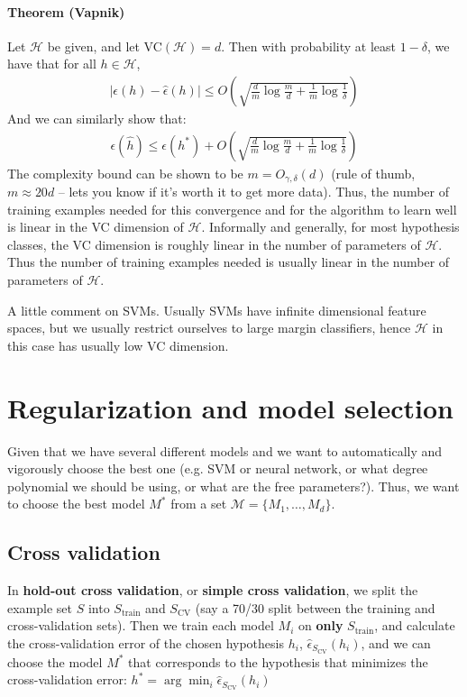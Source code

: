 \documentclass[letterpaper,10pt]{article}
\begin{document}
\paragraph{Theorem (Vapnik)} Let $\mathscr{H}$ be given, and let VC$(\mathscr{H})=d$. Then with probability at least $1-\delta$, we have that for all $h \in \mathscr{H}$,
\begin{align}
|\epsilon(h) - \hat \epsilon(h) | \leq O\left( \sqrt{\frac{d}{m} \log \frac{m}{d} + \frac{1}{m} \log \frac{1}{\delta}} \right)
\end{align}
And we can similarly show that:
\begin{align}
\epsilon(\hat h) \leq \epsilon(h^*) + O\left( \sqrt{\frac{d}{m} \log \frac{m}{d} + \frac{1}{m} \log \frac{1}{\delta}} \right)
\end{align}
The complexity bound can be shown to be $m=O_{\gamma,\delta}(d)$ (rule of thumb, $m\approx 20d$ -- lets you know if it's worth it to get more data). Thus, the number of training examples needed for this convergence and for the algorithm to learn well is linear in the VC dimension of $\mathscr{H}$. Informally and generally, for most hypothesis classes, the VC dimension is roughly linear in the number of parameters of $\mathscr{H}$. Thus the number of training examples needed is usually linear in the number of parameters of $\mathscr{H}$.

A little comment on SVMs. Usually SVMs have infinite dimensional feature spaces, but we usually restrict ourselves to large margin classifiers, hence $\mathscr{H}$ in this case has usually low VC dimension.

\section{Regularization and model selection}

Given that we have several different models and we want to automatically and vigorously choose the best one (e.g. SVM or neural network, or what degree polynomial we should be using, or what are the free parameters?). Thus, we want to choose the best model $M^*$ from a set $\mathscr{M}=\{M_1,\ldots,M_d\}$.

\subsection{Cross validation}

In \textbf{hold-out cross validation}, or \textbf{simple cross validation}, we split the example set $S$ into $S_\text{train}$ and $S_\text{CV}$ (say a 70/30 split between the training and cross-validation sets). Then we train each model $M_i$ on \textbf{only} $S_\text{train}$, and calculate the cross-validation error of the chosen hypothesis $h_i$, $\hat \epsilon_{S_\text{CV}} (h_i)$, and we can choose the model $M^*$ that corresponds to the hypothesis that minimizes the cross-validation error: $h^* = \arg \min_i \hat \epsilon_{S_\text{CV}} (h_i)$
\end{document}
